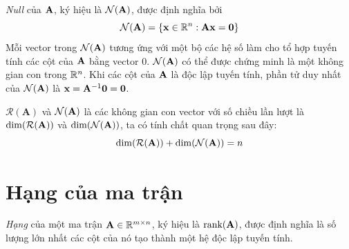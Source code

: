 \textit{Null} của $\mathbf{A}$, ký hiệu là $\mathcal{N}(\mathbf{A})$, được định nghĩa bởi
\begin{equation}
\mathcal{N}(\mathbf{A}) = \{\mathbf{x} \in \mathbb{R}^n : \mathbf{A}\mathbf{x} = \mathbf{0}\}
\end{equation}
Mỗi vector trong $\mathcal{N}(\mathbf{A})$ tương ứng với một bộ các hệ số làm cho
tổ hợp tuyến tính các cột của $\mathbf{A}$ bằng vector 0. $\mathcal{N}(\mathbf{A})$ có thể
được chứng minh là một không gian con trong $\mathbb{R}^n$. Khi các cột của $\mathbf{A}$ là
độc lập tuyến tính, phần tử duy nhất của $\mathcal{N}(\mathbf{A})$ là $\mathbf{x} = \mathbf{A}^{-1}\mathbf{0} = \mathbf{0}$.


$\mathcal{R}(\mathbf{A})$ và $\mathcal{N}(\mathbf{A})$ là các không gian con vector
với số chiều lần lượt là $\dim(\mathcal{R}(\mathbf{A}))$ và $\dim(\mathcal{N}(\mathbf{A}))$,
ta có tính chất quan trọng sau đây:
\begin{equation}
\dim(\mathcal{R}(\mathbf{A})) + \dim(\mathcal{N}(\mathbf{A})) = n
\end{equation}

\def\rank{\text{rank}}
\section{Hạng của ma trận} %
\label{sec:hang_cua_ma_tran}
\textit{Hạng} của một ma trận $\mathbf{A} \in \mathbb{R}^{m \times n}$, ký hiệu là
$\rank(\bA)$, được định nghĩa là số lượng lớn nhất các cột của nó tạo thành một
hệ độc lập tuyến tính.

